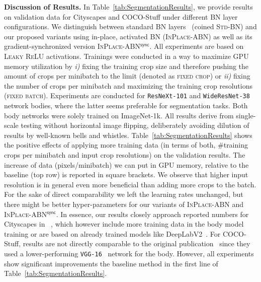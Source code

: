 \documentclass[10pt,twocolumn,letterpaper]{article}
\newcommand{\bnStd}{\textsc{Std-BN}\xspace}
\newcommand{\bnInplace}{\textsc{InPlace-ABN}\xspace}
\newcommand{\bnInplaceSync}{\textsc{InPlace-ABN$^{\mathsf{sync}}$}\xspace}
\newcommand{\fixedcrop}{\textsc{fixed crop}\xspace}
\newcommand{\fixedbatch}{\textsc{fixed batch}\xspace}
\newcommand{\myparagraph}[1]{\vspace{5pt}\noindent\textbf{#1}}
\begin{document}
\myparagraph{Discussion of Results.}
In Table~\ref{tab:SegmentationResults}, we provide results on validation data for Cityscapes and COCO-Stuff under different \textsc{BN} layer configurations. We distinguish between standard \textsc{BN} layers~\cite{IofSze15} (coined \bnStd) and our proposed variants using in-place, activated \textsc{BN} (\bnInplace) as well as its gradient-synchronized version \bnInplaceSync. All experiments are based on \textsc{Leaky ReLU} activations. Trainings were conducted in a way to maximize GPU memory utilization by \textit{i)} fixing the training crop size and therefore pushing the amount of crops per minibatch to the limit (denoted as \fixedcrop) or \textit{ii)} fixing the number of crops per minibatch and maximizing the training crop resolutions (\fixedbatch). Experiments are conducted for \texttt{ResNeXt-101} and \texttt{WideResNet-38} network bodies, where the latter seems preferable for segmentation tasks. Both body networks were solely trained on ImageNet-1k. All results derive from single-scale testing without horizontal image flipping, deliberately avoiding dilution of results by well-known bells and whistles.
Table~\ref{tab:SegmentationResults} shows the positive effects of applying more training data (in terms of both, \#training crops per minibatch and input crop resolutions) on the validation results. The increase of data (\wrt pixels/minibatch) we can put in GPU memory, relative to the baseline (top row) is reported in square brackets. We observe that higher input resolution is in general even more beneficial than adding more crops to the batch. For the sake of direct comparability we left the learning rates unchanged, but there might be better hyper-parameters for our variants of \bnInplace and \bnInplaceSync. In essence, our results closely approach reported numbers for Cityscapes in \eg~\cite{Gadde2017,zhao2016pspnet}, which however include more training data in the body model training or are based on already trained models like DeepLabV2~\cite{Chen2016}. For COCO-Stuff, results are not directly comparable to the original publication~\cite{Caesar2016} since they used a lower-performing \texttt{VGG-16}~\cite{Simonyan2014} network for the body. However, all experiments show significant improvements \wrt the baseline method in the first line of Table~\ref{tab:SegmentationResults}.
\end{document}
